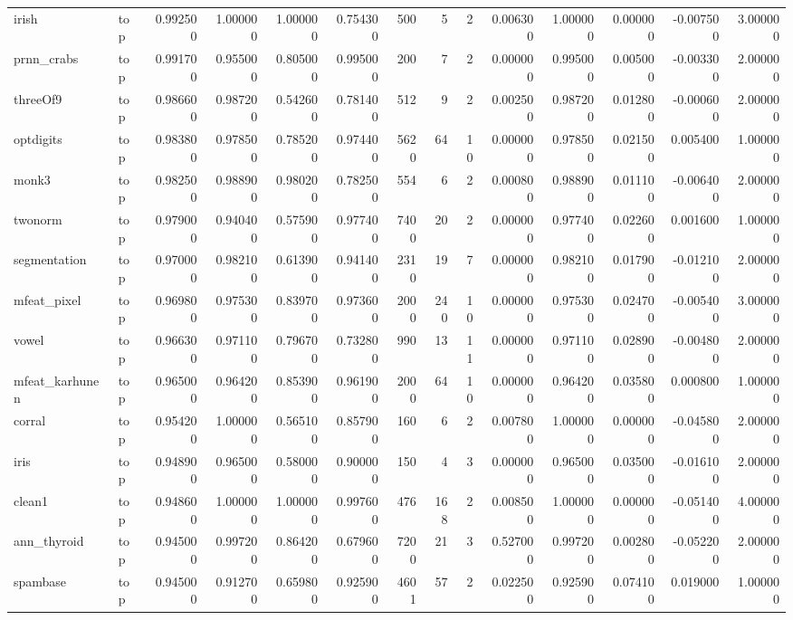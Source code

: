 \begin{longtable}{llrrrrrrrrrrrr}
irish & top & 0.992500 & 1.000000 & 1.000000 & 0.754300 & 500 & 5 & 2 & 0.006300 & 1.000000 & 0.000000 & -0.007500 & 3.000000 \\
prnn\_crabs & top & 0.991700 & 0.955000 & 0.805000 & 0.995000 & 200 & 7 & 2 & 0.000000 & 0.995000 & 0.005000 & -0.003300 & 2.000000 \\
threeOf9 & top & 0.986600 & 0.987200 & 0.542600 & 0.781400 & 512 & 9 & 2 & 0.002500 & 0.987200 & 0.012800 & -0.000600 & 2.000000 \\
optdigits & top & 0.983800 & 0.978500 & 0.785200 & 0.974400 & 5620 & 64 & 10 & 0.000000 & 0.978500 & 0.021500 & 0.005400 & 1.000000 \\
monk3 & top & 0.982500 & 0.988900 & 0.980200 & 0.782500 & 554 & 6 & 2 & 0.000800 & 0.988900 & 0.011100 & -0.006400 & 2.000000 \\
twonorm & top & 0.979000 & 0.940400 & 0.575900 & 0.977400 & 7400 & 20 & 2 & 0.000000 & 0.977400 & 0.022600 & 0.001600 & 1.000000 \\
segmentation & top & 0.970000 & 0.982100 & 0.613900 & 0.941400 & 2310 & 19 & 7 & 0.000000 & 0.982100 & 0.017900 & -0.012100 & 2.000000 \\
mfeat\_pixel & top & 0.969800 & 0.975300 & 0.839700 & 0.973600 & 2000 & 240 & 10 & 0.000000 & 0.975300 & 0.024700 & -0.005400 & 3.000000 \\
vowel & top & 0.966300 & 0.971100 & 0.796700 & 0.732800 & 990 & 13 & 11 & 0.000000 & 0.971100 & 0.028900 & -0.004800 & 2.000000 \\
mfeat\_karhunen & top & 0.965000 & 0.964200 & 0.853900 & 0.961900 & 2000 & 64 & 10 & 0.000000 & 0.964200 & 0.035800 & 0.000800 & 1.000000 \\
corral & top & 0.954200 & 1.000000 & 0.565100 & 0.857900 & 160 & 6 & 2 & 0.007800 & 1.000000 & 0.000000 & -0.045800 & 2.000000 \\
iris & top & 0.948900 & 0.965000 & 0.580000 & 0.900000 & 150 & 4 & 3 & 0.000000 & 0.965000 & 0.035000 & -0.016100 & 2.000000 \\
clean1 & top & 0.948600 & 1.000000 & 1.000000 & 0.997600 & 476 & 168 & 2 & 0.008500 & 1.000000 & 0.000000 & -0.051400 & 4.000000 \\
ann\_thyroid & top & 0.945000 & 0.997200 & 0.864200 & 0.679600 & 7200 & 21 & 3 & 0.527000 & 0.997200 & 0.002800 & -0.052200 & 2.000000 \\
spambase & top & 0.945000 & 0.912700 & 0.659800 & 0.925900 & 4601 & 57 & 2 & 0.022500 & 0.925900 & 0.074100 & 0.019000 & 1.000000 \\

\end{longtable}
